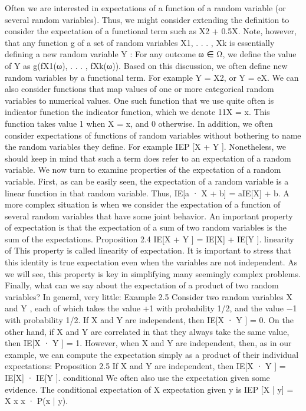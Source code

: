 Often we are interested in expectations of a function of a random variable (or several random variables). Thus, we might consider extending the definition to consider the expectation of a functional term such as X2 + 0.5X. Note, however, that any function g of a set of random variables X1, . . . , Xk is essentially defining a new random variable Y : For any outcome ω ∈ Ω, we define the value of Y as g(fX1(ω), . . . , fXk(ω)). Based on this discussion, we often define new random variables by a functional term. For example Y = X2, or Y = eX. We can also consider functions that map values of one or more categorical random variables to numerical values. One such function that we use quite often is indicator function the indicator function, which we denote 11{X = x}. This function takes value 1 when X = x, and 0 otherwise. In addition, we often consider expectations of functions of random variables without bothering to name the random variables they define. For example IEP [X + Y ]. Nonetheless, we should keep in mind that such a term does refer to an expectation of a random variable. We now turn to examine properties of the expectation of a random variable. First, as can be easily seen, the expectation of a random variable is a linear function in that random variable. Thus, IE[a · X + b] = aIE[X] + b. A more complex situation is when we consider the expectation of a function of several random variables that have some joint behavior. An important property of expectation is that the expectation of a sum of two random variables is the sum of the expectations. Proposition 2.4 IE[X + Y ] = IE[X] + IE[Y ]. linearity of This property is called linearity of expectation. It is important to stress that this identity is true expectation even when the variables are not independent. As we will see, this property is key in simplifying many seemingly complex problems. Finally, what can we say about the expectation of a product of two random variables? In general, very little: Example 2.5 Consider two random variables X and Y , each of which takes the value +1 with probability 1/2, and the value −1 with probability 1/2. If X and Y are independent, then IE[X · Y ] = 0. On the other hand, if X and Y are correlated in that they always take the same value, then IE[X · Y ] = 1. However, when X and Y are independent, then, as in our example, we can compute the expectation simply as a product of their individual expectations: Proposition 2.5 If X and Y are independent, then IE[X · Y ] = IE[X] · IE[Y ]. conditional We often also use the expectation given some evidence. The conditional expectation of X expectation given y is IEP [X | y] = X x x · P(x | y).


